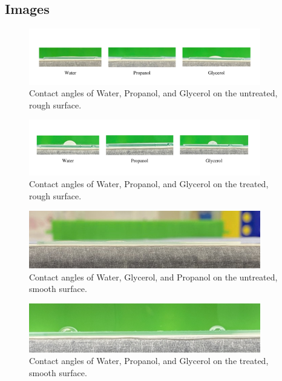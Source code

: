 \documentclass[pdflatex,sn-mathphys]{sn-jnl}%
\theoremstyle{thmstyleone}%
\theoremstyle{thmstyletwo}%
\theoremstyle{thmstylethree}%
\begin{document}
 \subsection{Images}\label{subsec2}
\begin{figure}[h]%
\centering
\includegraphics[width=0.9\textwidth]{photos/Untreated_Rough.png}
\caption{Contact angles of Water, Propanol, and Glycerol on the untreated, rough surface.}\label{fig1}
\end{figure}
\begin{figure}[h]%
\centering
\includegraphics[width=0.9\textwidth]{photos/Treated_Rough.png}
\caption{Contact angles of Water, Propanol, and Glycerol on the treated, rough surface. }\label{fig1}
\end{figure}
\begin{figure}[h]%
\centering
\includegraphics[width=0.9\textwidth]{photos/Untreated_Smooth.jpeg}
\caption{Contact angles of Water, Glycerol, and Propanol on the untreated, smooth surface. }\label{fig1}
\end{figure}
\begin{figure}[h]%
\centering
\includegraphics[width=0.9\textwidth]{photos/Treated_Smooth.jpeg}
\caption{Contact angles of Water, Propanol, and Glycerol on the treated, smooth surface. }\label{fig1}
\end{figure}
\end{document}
